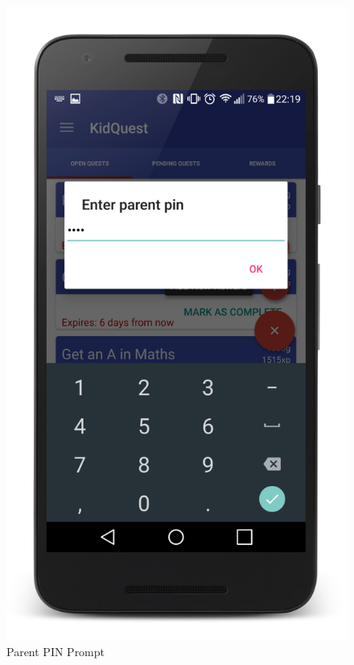 \begin{figure}[ht] 
  \begin{minipage}[b]{0.45\linewidth} 
    \centering
    \includegraphics[width=.8\linewidth]{../images/Screenshot/ParentPinPrompt.jpg} 
    \caption{Parent PIN Prompt} 
    \vspace{4ex}
  \end{minipage}%
  \begin{minipage}[b]{0.45\linewidth}
    \centering

\end{minipage}
\end{figure}
